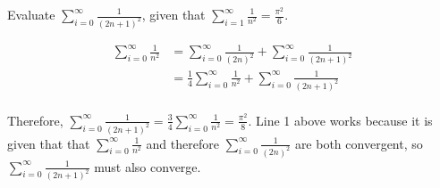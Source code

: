 Evaluate $\sum_{i = 0}^{\infty} \frac{1}{(2n + 1)^2}$, given that $\sum_{i = 1}^{\infty} \frac{1}{n^2} = \frac{\pi^2}{6}$.

\begin{align*}
  \sum_{i = 0}^{\infty} \frac{1}{n^2} &= \sum_{i = 0}^{\infty} \frac{1}{(2n)^2} + \sum_{i = 0}^{\infty} \frac{1}{(2n + 1)^2} \\
  &= \frac{1}{4}\sum_{i = 0}^{\infty} \frac{1}{n^2} + \sum_{i = 0}^{\infty} \frac{1}{(2n + 1)^2} \\
\end{align*}

Therefore, $\sum_{i = 0}^{\infty} \frac{1}{(2n + 1)^2} = \frac{3}{4}\sum_{i = 0}^{\infty} \frac{1}{n^2} = \frac{\pi^2}{8}$. Line 1 above works because it is given that that $\sum_{i = 0}^{\infty} \frac{1}{n^2}$ and therefore $\sum_{i = 0}^{\infty} \frac{1}{(2n)^2}$ are both convergent, so $\sum_{i = 0}^{\infty} \frac{1}{(2n + 1)^2}$ must also converge.


